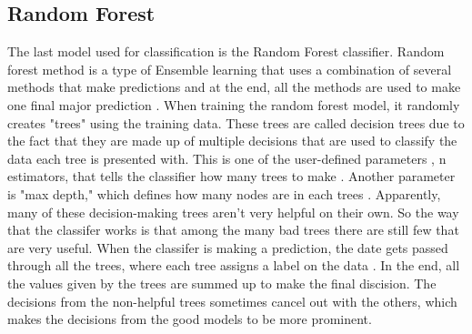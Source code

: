 \documentclass{report}
\begin{document}
\subsection{Random Forest}
The last model used for classification is the Random Forest classifier. Random forest method is a type of Ensemble learning that uses a combination of several methods 
that make predictions and at the end, all the methods are used to make one final major 
prediction \cite{random}. When training the random forest model, it randomly creates "trees" using the training data. 
These trees are called decision trees due to the fact that they are made up of multiple decisions 
that are used to classify the data each tree is presented with. This is one of the user-defined parameters , n estimators, that tells the classifier how many trees 
to make \cite{skforest}. Another parameter is "max depth," which defines how many nodes are in each trees \cite{skforest}. Apparently, many of these decision-making 
trees aren't very helpful on their own. So the way that the classifer works is that among the many bad 
trees there are still few that are very useful. When the classifer is making a prediction, 
the date gets passed through all the trees, where each tree assigns a label on the data \cite{random}. In the end, all the values 
given by the trees are summed up to make the final discision. The decisions from the non-helpful 
trees sometimes cancel out with the others, which makes the decisions from the good models to be more 
prominent.
\end{document}
